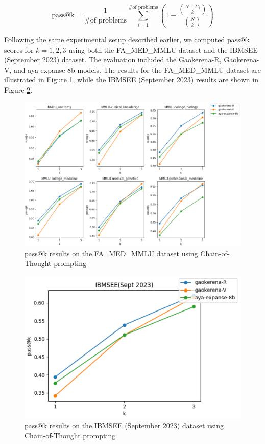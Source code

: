 \documentclass[conference]{IEEEtran}
\begin{document}
\begin{equation}
\text{pass@k} = \frac{1}{\text{\# of problems}} \sum_{i=1}^{\text{\# of problems}} \left( 1 -  \frac{\binom{N - C_i}{k}}{\binom{N}{k}} \right)
\end{equation}

Following the same experimental setup described earlier, we computed pass@k scores for \(k = 1, 2, 3\) using both the FA\_MED\_MMLU dataset and the IBMSEE (September 2023) dataset. The evaluation included the Gaokerena-R, Gaokerena-V, and aya-expanse-8b models. The results for the FA\_MED\_MMLU dataset are illustrated in Figure
\ref{fig1}, while the IBMSEE (September 2023) results are shown in Figure
\ref{fig2}.

\begin{figure}[h]
    \centering
    \includegraphics[width=1.0\linewidth]{fig1.png}
    \caption{pass@k results on the FA\_MED\_MMLU dataset using Chain-of-Thought prompting}
    \label{fig1}
\end{figure}

\begin{figure}[h]
    \centering
    \includegraphics[width=0.8\linewidth]{fig2.png}
    \caption{pass@k results on the IBMSEE (September 2023) dataset using Chain-of-Thought prompting}
    \label{fig2}
\end{figure}
\end{document}

